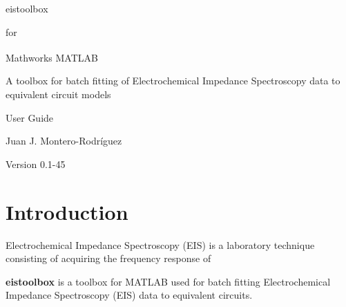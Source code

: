 \documentclass[10pt,a4paper]{memoir}
\begin{document}
\setlength{\parindent}{0pt}


 \vspace*{3cm}
	
 \begin{center}
 	\HUGE eistoolbox \par
 \end{center}
 \begin{center}
 	\LARGE for \par
 \end{center}
 \begin{center}
 	\HUGE Mathworks\textsuperscript{\textregistered} MATLAB \par
 \end{center}
 
 \vspace*{2cm}
 
\begin{center}
	\Large A toolbox for batch fitting of Electrochemical Impedance Spectroscopy data to equivalent circuit models
\end{center} 
 
 \vspace*{2cm}
 
 \begin{center}
 	\Huge User Guide \par
 \end{center}
 \begin{center}
 	\LARGE Juan J. Montero-Rodríguez \par
 \end{center}
 
 \vspace*{4cm}
 
 \begin{center}
 	\Large Version 0.1-45
 \end{center}

\clearpage




\tableofcontents

\chapter{Introduction}

Electrochemical Impedance Spectroscopy (EIS) is a laboratory technique consisting of acquiring the frequency response of

\textbf{eistoolbox} is a toolbox for MATLAB\textregistered{} used for batch fitting Electrochemical Impedance Spectroscopy (EIS) data to equivalent circuits. 
\end{document}
